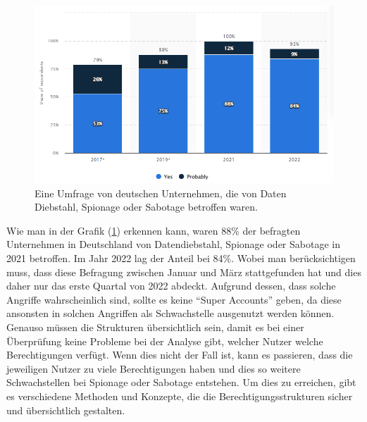 \begin{figure}[h!]
 \centering
 \includegraphics[width=1\textwidth]{gfx/Picture/Cyber_Crime.PNG}
 \caption{Eine Umfrage von deutschen Unternehmen, die von Daten Diebstahl, Spionage oder Sabotage betroffen waren. \cite{Stat22}}
 \label{fig:Crime}
\end{figure}

Wie man in der Grafik (\ref{fig:Crime}) erkennen kann, waren 88\% der befragten Unternehmen in Deutschland von Datendiebstahl, Spionage oder Sabotage in 2021 betroffen.
Im Jahr 2022 lag der Anteil bei 84\%.
Wobei man berücksichtigen muss, dass diese Befragung zwischen Januar und März stattgefunden hat und dies daher nur das erste Quartal von 2022 abdeckt.
Aufgrund dessen, dass solche Angriffe wahrscheinlich sind, sollte es keine "`Super Accounts"' geben, da diese ansonsten in solchen Angriffen als Schwachstelle ausgenutzt werden können.
Genauso müssen die Strukturen übersichtlich sein, damit es bei einer Überprüfung keine Probleme bei der Analyse gibt, welcher Nutzer welche Berechtigungen verfügt.
Wenn dies nicht der Fall ist, kann es passieren, dass die jeweiligen Nutzer zu viele Berechtigungen haben und dies so weitere Schwachstellen bei Spionage oder Sabotage entstehen.
Um dies zu erreichen, gibt es verschiedene Methoden und Konzepte, die die Berechtigungsstrukturen sicher und übersichtlich gestalten.

%
%
